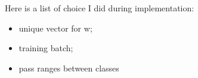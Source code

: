 Here is a list of choice  I did  during implementation:
\begin{itemize}
  \item unique vector for w;
  \item training batch;
  \item pass ranges between classes 
\end{itemize}